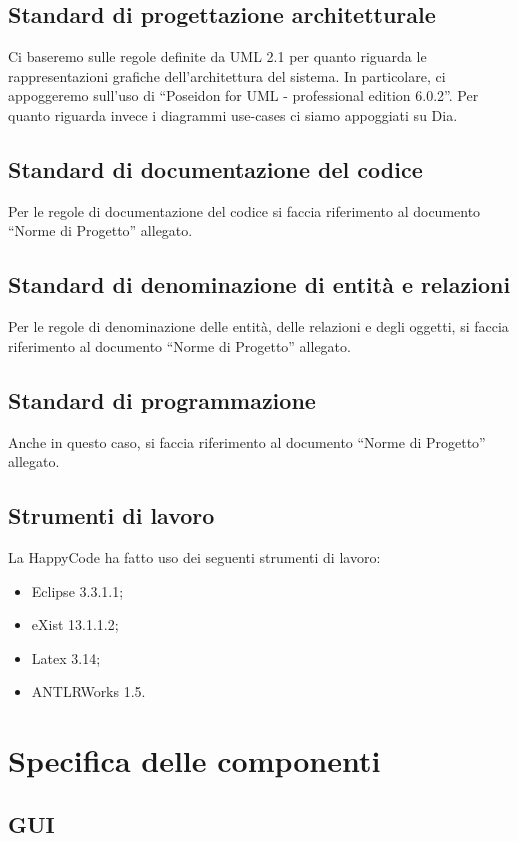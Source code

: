 \documentclass[11pt,titlepage,a4paper]{report}
\begin{document}
\section{Standard di progettazione architetturale}
Ci baseremo sulle regole definite da UML 2.1 per quanto riguarda le rappresentazioni grafiche dell'architettura del sistema. In particolare, ci appoggeremo sull'uso di ``Poseidon for UML - professional edition 6.0.2''. Per quanto riguarda invece i diagrammi use-cases ci siamo appoggiati su Dia.
\section{Standard di documentazione del codice}
Per le regole di documentazione del codice si faccia riferimento al documento ``Norme di Progetto'' allegato.
\section{Standard di denominazione di entit\`a e relazioni}
Per le regole di denominazione delle entit\`a, delle relazioni e degli oggetti, si faccia riferimento al documento ``Norme di Progetto'' allegato.
\section{Standard di programmazione}
Anche in questo caso, si faccia riferimento al documento ``Norme di Progetto'' allegato.
\section{Strumenti di lavoro}
La HappyCode ha fatto uso dei seguenti strumenti di lavoro:
\begin{itemize}
\item Eclipse 3.3.1.1;
\item eXist 13.1.1.2; 
\item Latex 3.14;
\item ANTLRWorks 1.5.
\end{itemize}
\chapter{Specifica delle componenti}
\section{GUI}
\end{document}
